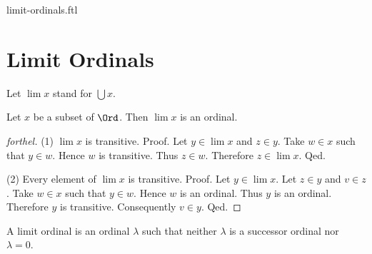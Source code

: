\documentclass{naproche-library}
\begin{document}
\begin{smodule}{limit-ordinals.ftl}

  \section*{Limit Ordinals}

  \begin{forthel}
    Let $\lim x$ stand for $\bigcup x$.
  \end{forthel}

  \begin{proposition}[forthel,id=SET_THEORY_02_7202164443185152]
    Let $x$ be a subset of $\Ord$.
    Then $\lim x$ is an ordinal.
  \end{proposition}
  \begin{proof}[forthel]
    (1) $\lim x$ is transitive. \newline
    Proof.
      Let $y \in \lim x$ and $z \in y$.
      Take $w \in x$ such that $y \in w$.
      Hence $w$ is transitive.
      Thus $z \in w$.
      Therefore $z \in \lim x$.
    Qed.

    (2) Every element of $\lim x$ is transitive. \newline
    Proof.
      Let $y \in \lim x$.
      Let $z \in y$ and $v \in z$.
      Take $w \in x$ such that $y \in w$.
      Hence $w$ is an ordinal.
      Thus $y$ is an ordinal.
      Therefore $y$ is transitive.
      Consequently $v \in y$.
    Qed.
  \end{proof}

  \begin{definition}[forthel,id=SET_THEORY_02_7678388934279168]
    A limit ordinal is an ordinal $\lambda$ such that neither $\lambda$ is a successor ordinal nor $\lambda = 0$.
  \end{definition}
\end{smodule}
\end{document}
